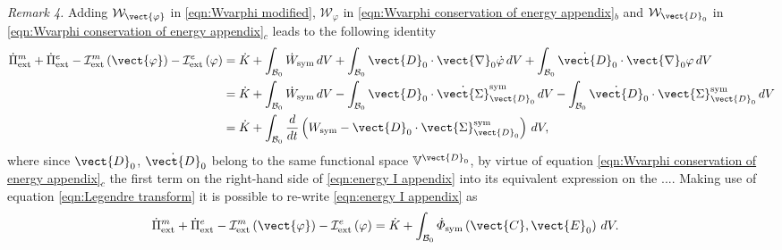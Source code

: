 \noindent \textit{Remark 4.} Adding $\mathcal{W}_{\vect{\varphi}}$ in \eqref{eqn:Wvarphi modified}, $\mathcal{W}_{\varphi}$ in \eqref{eqn:Wvarphi conservation of energy appendix}$_b$ and $\mathcal{W}_{\vect{D}_0}$ in \eqref{eqn:Wvarphi conservation of energy appendix}$_c$ leads to the following identity
%
\begin{equation}\label{eqn:energy I appendix}
\begin{aligned}
\dot{\Pi}_{\text{ext}}^m + \dot{\Pi}_{\text{ext}}^e - \mathcal{I}^m_{\text{ext}}\left(\vect{\varphi}\right) - 
\mathcal{I}^e_{\text{ext}}\left({\varphi}\right)& =
%
%
%
\dot{K} + \int_{\mathcal{B}_0}\dot{W}_{\text{sym}}\,dV  +
%
\int_{\mathcal{B}_0}\vect{D}_0\cdot\vect{\nabla}_0\dot{\varphi}\,dV+
%
\int_{\mathcal{B}_0}\dot{\vect{D}}_0\cdot\vect{\nabla}_0\varphi\,dV\\
%
&=\dot{K} + \int_{\mathcal{B}_0}\dot{W}_{\text{sym}}\,dV  -
%
\int_{\mathcal{B}_0}\vect{D}_0\cdot\dot{\vect{\Sigma}}^{\text{sym}}_{\vect{D}_0}\,dV-
%
\int_{\mathcal{B}_0}\dot{\vect{D}}_0\cdot\vect{\Sigma}^{\text{sym}}_{\vect{D}_0}\,dV\\
%
&=\dot{K} + 
%
\int_{\mathcal{B}_0}\frac{d}{dt}\left({W}_{\text{sym}} - \vect{D}_0\cdot{\vect{\Sigma}}^{\text{sym}}_{\vect{D}_0}\right)\,dV,
%
\end{aligned}
\end{equation}
%
where since $\vect{D}_0$, $\dot{\vect{D}}_0$ belong to the same functional space $\mathbb{V}^{\vect{D}_0}$, by virtue of equation \eqref{eqn:Wvarphi conservation of energy appendix}$_c$ the first term on the right-hand side of \eqref{eqn:energy I appendix} into its equivalent expression on the .... Making use of equation  \eqref{eqn:Legendre transform} it is possible to re-write \eqref{eqn:energy I appendix} as
%
\begin{equation}\label{eqn:energy II appendix}
\begin{aligned}
\dot{\Pi}_{\text{ext}}^m + \dot{\Pi}_{\text{ext}}^e - \mathcal{I}^m_{\text{ext}}\left(\vect{\varphi}\right) - \mathcal{I}^e_{\text{ext}}\left(\varphi\right)& =
\dot{K} + 
%
\int_{\mathcal{B}_0}\dot{\varPhi}_{\text{sym}}\left(\vect{C},\vect{E}_0\right)\,dV.
%
\end{aligned}
\end{equation}

